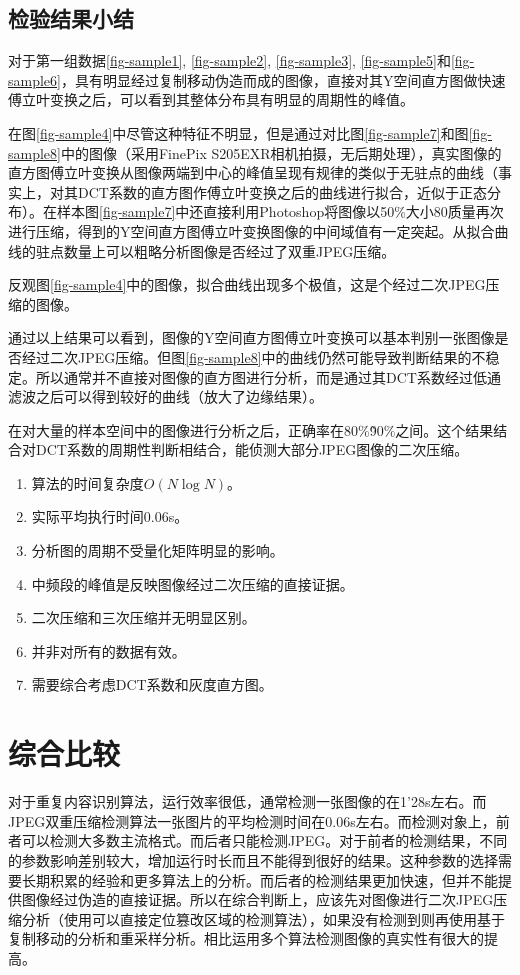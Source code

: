 \documentclass[a4paper, 10pt, notitlepage]{report}
\begin{document}
		\subsection{检验结果小结}
			对于第一组数据\ref{fig-sample1}, \ref{fig-sample2}, \ref{fig-sample3}, \ref{fig-sample5}和\ref{fig-sample6}，具有明显经过复制移动伪造而成的图像，直接对其Y空间直方图做快速傅立叶变换之后，可以看到其整体分布具有明显的周期性的峰值。

			在图\ref{fig-sample4}中尽管这种特征不明显，但是通过对比图\ref{fig-sample7}和图\ref{fig-sample8}中的图像（采用FinePix S205EXR相机拍摄，无后期处理），真实图像的直方图傅立叶变换从图像两端到中心的峰值呈现有规律的类似于无驻点的曲线（事实上，对其DCT系数的直方图作傅立叶变换之后的曲线进行拟合，近似于正态分布）。在样本图\ref{fig-sample7}中还直接利用Photoshop将图像以50\%大小80质量再次进行压缩，得到的Y空间直方图傅立叶变换图像的中间域值有一定突起。从拟合曲线的驻点数量上可以粗略分析图像是否经过了双重JPEG压缩。

			反观图\ref{fig-sample4}中的图像，拟合曲线出现多个极值，这是个经过二次JPEG压缩的图像。

			通过以上结果可以看到，图像的Y空间直方图傅立叶变换可以基本判别一张图像是否经过二次JPEG压缩。但图\ref{fig-sample8}中的曲线仍然可能导致判断结果的不稳定。所以通常并不直接对图像的直方图进行分析，而是通过其DCT系数经过低通滤波之后可以得到较好的曲线（放大了边缘结果）。

			在对大量的样本空间中的图像进行分析之后，正确率在80\%\~90\%之间。这个结果结合对DCT系数的周期性判断相结合，能侦测大部分JPEG图像的二次压缩。
			\begin{enumerate}\setlength{\itemsep}{-0.1cm}
				\item 算法的时间复杂度$O(N \log N)$。
				\item 实际平均执行时间0.06s。
				\item 分析图的周期不受量化矩阵明显的影响。
				\item 中频段的峰值是反映图像经过二次压缩的直接证据。
				\item 二次压缩和三次压缩并无明显区别。
				\item 并非对所有的数据有效。
				\item 需要综合考虑DCT系数和灰度直方图。
			\end{enumerate}

	\section{综合比较}
		对于重复内容识别算法，运行效率很低，通常检测一张图像的在1'28s左右。而JPEG双重压缩检测算法一张图片的平均检测时间在0.06s左右。而检测对象上，前者可以检测大多数主流格式。而后者只能检测JPEG。对于前者的检测结果，不同的参数影响差别较大，增加运行时长而且不能得到很好的结果。这种参数的选择需要长期积累的经验和更多算法上的分析。而后者的检测结果更加快速，但并不能提供图像经过伪造的直接证据。所以在综合判断上，应该先对图像进行二次JPEG压缩分析（使用可以直接定位篡改区域的检测算法），如果没有检测到则再使用基于复制移动的分析和重采样分析。相比运用多个算法检测图像的真实性有很大的提高。
\end{document}
